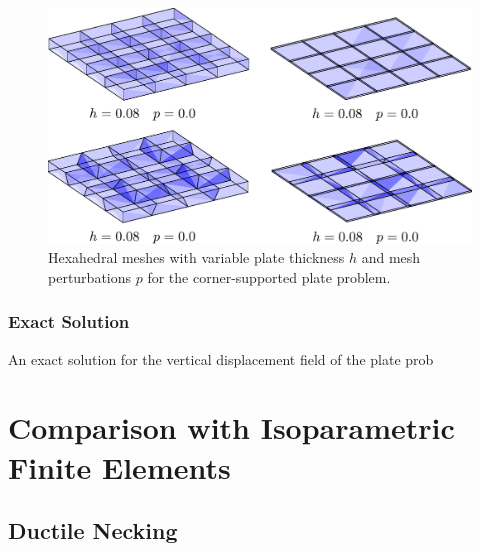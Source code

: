 \begin{figure}[!h]
  \centering
  \includegraphics[width=6.0in]{figures/plate_meshes.pdf}
  \caption{Hexahedral meshes with variable plate thickness $h$ and mesh perturbations $p$ for the corner-supported plate problem.}
  \label{fig:plate_meshes}
\end{figure}

\subsubsection{Exact Solution}

An exact solution for the vertical displacement field of the plate prob

\section{Comparison with Isoparametric Finite Elements}

\subsection*{Ductile Necking}

